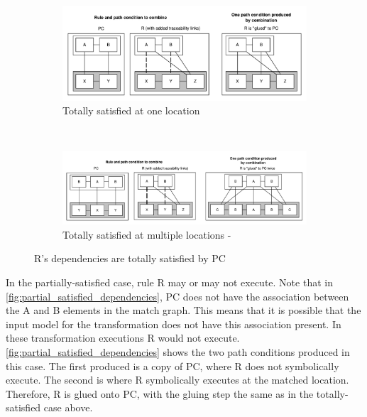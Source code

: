 \begin{figure}[htb]
        \centering
        \begin{subfigure}[b]{0.7\textwidth}
                \centering
                \includegraphics[width=1\textwidth]{./figures/building_path_conditions/total_satisfied_dependencies.pdf}
                \caption{Totally satisfied at one location}
                \label{fig:total_satisfied_dependencies}
        \end{subfigure}%
        \\
        \begin{subfigure}[b]{0.8\textwidth}
                \centering
                \includegraphics[width=1\textwidth]{./figures/building_path_conditions/multiple_total_satisfied_dependencies.pdf}
                \caption{Totally satisfied at multiple locations - }
                \label{fig:multiple_total_satisfied_dependencies}
        \end{subfigure}%
        \caption{R's dependencies are totally satisfied by PC}
        \label{fig:totes_sat_deps}
\end{figure}

In the partially-satisfied case, rule R may or may not execute. Note that in \cref{fig:partial_satisfied_dependencies}, PC does not have the association between the A and B elements in the match graph. This means that it is possible that the input model for the transformation does not have this association present. In these transformation executions R would not execute.
\cref{fig:partial_satisfied_dependencies} shows the two path conditions produced in this case. The first produced is a copy of PC, where R does not symbolically execute. The second is where R symbolically executes at the matched location. Therefore, R is glued onto PC, with the gluing step the same as in the totally-satisfied case above.

